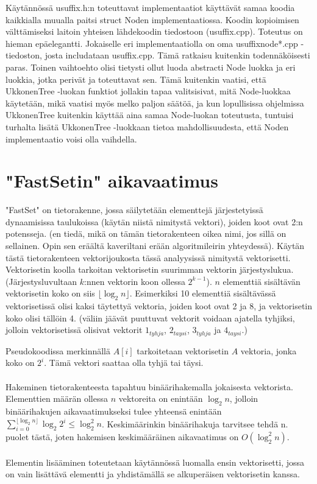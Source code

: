 \documentclass{article}
\begin{document}
        Käytännössä usuffix.h:n toteuttavat implementaatiot käyttävät samaa koodia kaikkialla muualla paitsi
        struct Noden implementaatiossa. Koodin kopioimisen välttämiseksi laitoin yhteisen lähdekoodin tiedostoon (usuffix.cpp).
        Toteutus on hieman epäelegantti. Jokaiselle eri implementaatiolla on oma usuffixnode*.cpp -tiedoston, josta 
        includataan usuffix.cpp. Tämä ratkaisu kuitenkin todennäköisesti paras. Toinen vaihtoehto olisi tietysti ollut
        luoda abstracti Node luokka ja eri luokkia, jotka perivät ja toteuttavat sen. Tämä kuitenkin vaatisi, että
        UkkonenTree -luokan funktiot jollakin tapaa valitsisivat, mitä Node-luokkaa käytetään, mikä vaatisi myös melko
        paljon säätöä, ja kun lopullisissa ohjelmissa UkkonenTree kuitenkin käyttää aina samaa Node-luokan toteutusta,
        tuntuisi turhalta lisätä UkkonenTree -luokkaan tietoa mahdollisuudesta, että Noden implementaatio voisi olla 
        vaihdella.
        
  \newpage
  \section{"FastSetin" aikavaatimus}

    "FastSet" on tietorakenne, jossa säilytetään elementtejä järjestetyissä dynaamisissa taulukoissa (käytän niistä
    nimitystä vektori), joiden koot ovat 2:n potensseja. (en tiedä, mikä on tämän tietorakenteen oikea nimi, jos sillä 
    on sellainen. Opin sen eräältä kaveriltani erään algoritmileirin yhteydessä). Käytän tästä tietorakenteen vektorijoukosta
    tässä analyysissä nimitystä vektorisetti. Vektorisetin koolla tarkoitan vektorisetin suurimman vektorin järjestyslukua.
    (Järjestysluvultaan $k$:nnen vektorin koon ollessa $2^{k-1}$). $n$ elementtiä sisältävän vektorisetin koko on siis
    $\lfloor \log_2 n \rfloor$. Esimerkiksi 10 elementtiä sisältävässä vektorisetissä olisi kaksi täytettyä vektoria, joiden 
    koot ovat 2 ja 8, ja vektorisetin koko olisi tällöin 4. (väliin jäävät puuttuvat vektorit voidaan ajatella tyhjiksi, 
    jolloin vektorisetissä olisivat vektorit $1_{tyhja}$, $2_{taysi}$, $3_{tyhja}$ ja $4_{taysi}$.)
    
    Pseudokoodissa merkinnällä $A[i]$ tarkoitetaan vektorisetin $A$ vektoria, jonka koko on $2^i$. Tämä vektori saattaa
    olla tyhjä tai täysi.
    \\ \\
    Hakeminen tietorakenteesta tapahtuu binäärihakemalla jokaisesta vektorista. Elementtien määrän ollessa $n$ vektoreita on 
    enintään $\log_2n$, jolloin binäärihakujen aikavaatimukseksi tulee yhteensä enintään $\sum_{i=0}^{\lfloor \log_2n \rfloor}
    {\log_2{2^i}}\leq \log_2^2 n$. Keskimäärinkin binäärihakuja tarvitsee tehdä n. puolet tästä, joten hakemisen keskimääräinen
    aikavaatimus on $O(\log_2^2 n)$.
    \\ \\
    Elementin lisääminen toteutetaan käytännössä luomalla ensin vektorisetti, jossa on vain lisättävä elementti ja yhdistämällä 
    se alkuperäisen vektorisetin kanssa.
    
\end{document}
